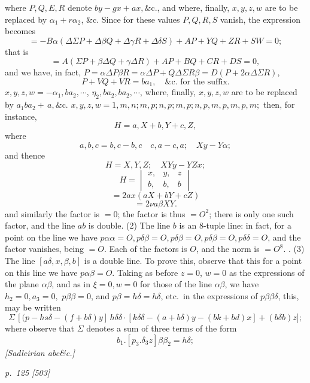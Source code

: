 \documentclass[11pt,a4paper]{book}
\begin{document}
\noindent
where $P, Q, E, R$ denote $by - gx + ax, \&\text{c.}$, and where, finally, $x, y, z, w$ are to be
replaced by $\alpha_1 + r\alpha_2$, \&c. Since for these values $P, Q, R, S$ vanish, the expression
becomes
\[
= -B\alpha (\Delta\Sigma P + \Delta\beta Q + \Delta\gamma R + \Delta\delta S)
+ A P + Y Q + Z R + S W = 0;
\]
that is
\[
= A(\Sigma P + \beta\Delta Q + \gamma\Delta R) + A P + B Q + C R + D S = 0,
\]
and we have, in fact, $P = \alpha\Delta P\beta R = \alpha\Delta P + Q\Delta\Sigma R\beta = D(P + 2\alpha\Delta\Sigma R)$,
\[
P + V Q + V R = b a_1, \quad \&\text{c. for the suffix.}
\]
$x, y, z, w = -\alpha_1, b a_2, \cdots$, $\eta_2, b a_2, b a_2, \cdots$, where, finally, $x, y, z, w$ are to be
replaced by $a_1 b a_2 + \,a, \&\text{c.}$
$x, y, z, w = 1, m, n; m, p; n, p; m, p; n, p, m, p, m, p, m;$
then, for instance,
\[
H = a, X + b, Y + c, Z,
\]
where
\[
a, b, c = b, c - b, c \quad c, a - c, a; \quad X y - Y \alpha;
\]
and thence
\[
H = X, Y, Z; \quad XYy - YZx;
\]
\[
H = \begin{vmatrix} x, & y, & z \\ b, & b, & b \end{vmatrix}
\]
\[
= 2ax(aX + b Y + cZ)
\]
\[
= 2\nu a\beta XY.
\]
and similarly the factor is $= 0$; the factor is thus $= O^2$; there is only one such
factor, and the line $ab$ is double.
\quad(2) The line $b$ is an 8-tuple line: in fact, for a point on the line we have
$p\alpha\alpha = O, p\delta\beta = O, p\delta\beta = O, p\delta\beta = O, p\delta\delta = O$, and the factor vanishes, being $= O$.
Each of the factors is $O$, and the norm is $= O^8$.
. (3) The line $[a\delta, x, \beta, b]$ is a double line. To prove this, observe that this
for a point on this line we have $p\alpha\beta = O$.
Taking as before $z = 0$, $w = 0$ as the expressions of the plane $\alpha\beta$, and as
in $\xi = 0, w = 0$ for those of the line $\alpha\beta$, we have $h_2 = 0, a_3 = 0,$
$p\beta\beta = 0$, and $p\beta = h\delta = h\delta$, etc.\ in the expressions of $p\beta\beta\delta$, this, may be written
\[
\Sigma\,[(p - h s\delta - (f + b\delta) y]\,h\delta\delta\cdot[k\delta\delta - (a + b\delta) y - (b k + bd) x]+(b\delta b) z];
\]
where observe that $\Sigma$ denotes a sum of three terms of the form
\[
b_1.[p_3.\delta_3 z]\beta\beta_2 = h\delta;
\]
\textit{[Sadleirian abc\&c.]}

\clearpage

\bigskip
\textit{p.~125 [503]}
\smallskip
\end{document}
